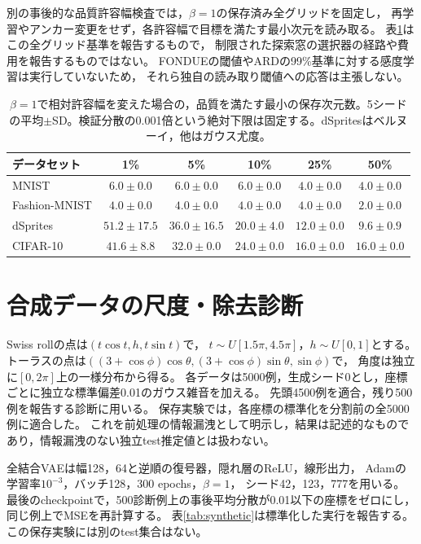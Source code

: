 \documentclass[11pt,a4paper]{ltjsarticle}
\begin{document}
別の事後的な品質許容幅検査では，$\beta=1$の保存済み全グリッドを固定し，
再学習やアンカー変更をせず，各許容幅で目標を満たす最小次元を読み取る。
表\ref{tab:margin}はこの全グリッド基準を報告するもので，
制限された探索窓の選択器の経路や費用を報告するものではない。
FONDUEの閾値やARDの99\%基準に対する感度学習は実行していないため，
それら独自の読み取り閾値への応答は主張しない。
\begin{table}[H]
\caption{$\beta=1$で相対許容幅を変えた場合の，品質を満たす最小の保存次元数。5シードの平均$\pm$SD。検証分散の0.001倍という絶対下限は固定する。dSpritesはベルヌーイ，他はガウス尤度。}\label{tab:margin}
\footnotesize
\setlength{\tabcolsep}{3.5pt}
\begin{tabular*}{\textwidth}{@{\extracolsep{\fill}}lccccc@{}}
\toprule
データセット & 1\% & 5\% & 10\% & 25\% & 50\% \\
\midrule
MNIST & $6.0 \pm 0.0$ & $6.0 \pm 0.0$ & $6.0 \pm 0.0$ & $4.0 \pm 0.0$ & $4.0 \pm 0.0$ \\
Fashion-MNIST & $4.0 \pm 0.0$ & $4.0 \pm 0.0$ & $4.0 \pm 0.0$ & $4.0 \pm 0.0$ & $2.0 \pm 0.0$ \\
dSprites & $51.2 \pm 17.5$ & $36.0 \pm 16.5$ & $20.0 \pm 4.0$ & $12.0 \pm 0.0$ & $9.6 \pm 0.9$ \\
CIFAR-10 & $41.6 \pm 8.8$ & $32.0 \pm 0.0$ & $24.0 \pm 0.0$ & $16.0 \pm 0.0$ & $16.0 \pm 0.0$ \\
\bottomrule
\end{tabular*}
\end{table}

\section{合成データの尺度・除去診断}\label{app:synthetic}
Swiss rollの点は$(t\cos t,h,t\sin t)$で，
$t\sim U[1.5\pi,4.5\pi]$，$h\sim U[0,1]$とする。
トーラスの点は$((3+\cos\phi)\cos\theta,(3+\cos\phi)\sin\theta,\sin\phi)$で，
角度は独立に$[0,2\pi]$上の一様分布から得る。
各データは5000例，生成シード0とし，座標ごとに独立な標準偏差0.01のガウス雑音を加える。
先頭4500例を適合，残り500例を報告する診断に用いる。
保存実験では，各座標の標準化を分割前の全5000例に適合した。
これを前処理の情報漏洩として明示し，結果は記述的なものであり，情報漏洩のない独立test推定値とは扱わない。

全結合VAEは幅128，64と逆順の復号器，隠れ層のReLU，線形出力，
Adamの学習率$10^{-3}$，バッチ128，300 epochs，$\beta=1$，
シード42，123，777を用いる。
最後のcheckpointで，500診断例上の事後平均分散が0.01以下の座標をゼロにし，
同じ例上でMSEを再計算する。
表\ref{tab:synthetic}は標準化した実行を報告する。
この保存実験には別のtest集合はない。
\end{document}
